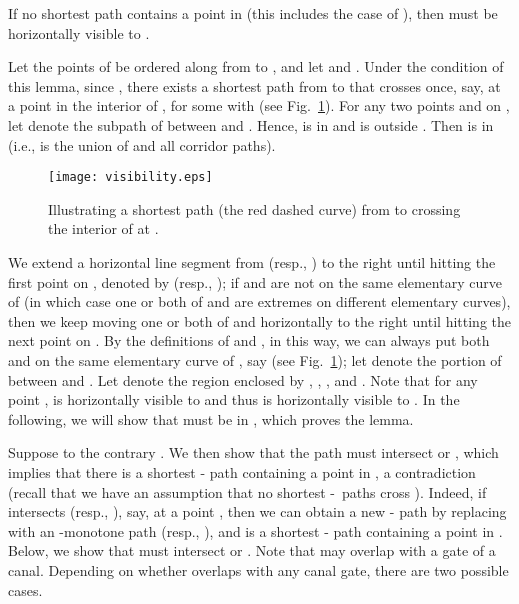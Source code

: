 \documentclass[english,runningheads,11pt]{llncs}
\def\st{-}
\newenvironment{proof}{\noindent {\textbf{Proof:}}\rm}{\hfill \rm}
\begin{document}
\begin{lemma}\label{lem:160}
If no shortest path  contains a point in
 (this includes the case of ), then
 must be horizontally visible to .
\end{lemma}
\begin{proof}
Let the points of  be
 ordered along  from  to
, and let  and . Under the condition of this lemma, since
, there exists a shortest path
 from  to  that crosses  once, say, at a point  in
the interior of ,
for some  with  (see Fig.~\ref{fig:visibility}).
For any two points  and 
on , let  denote the subpath of  between
 and . Hence,  is in  and  is outside . Then
 is in  (i.e.,  is the union of  and all corridor paths).


\begin{figure}[t]
\begin{minipage}[t]{\linewidth}
\begin{center}
\texttt{[image: visibility.eps]}
\caption{\footnotesize Illustrating a shortest path (the red dashed curve) from
 to  crossing the interior of  at .}
\label{fig:visibility}
\end{center}
\end{minipage}
\vspace*{-0.15in}
\end{figure}



We extend a horizontal line segment from  (resp., ) to the right until
hitting the first point on , denoted by  (resp., );
if  and  are not on the same elementary curve of
 (in which case
one or both of  and  are extremes on different
elementary curves),
then we keep moving one or both of  and  horizontally
to the right until hitting the next point on .
By the definitions of  and , in this way,
we can always put both  and  on the same
elementary curve of , say  (see Fig.~\ref{fig:visibility}); let
 denote the
portion of  between  and . Let  denote the
region enclosed by , ,
, and . Note that for
any point ,  is horizontally visible to
 and thus is horizontally visible to
.
In the following, we will show that  must be in , which proves the lemma.


Suppose to the contrary . We then show that
the path  must intersect  or
, which implies that
there is a shortest - path containing a point in
,
a contradiction (recall that we have an assumption that no shortest \st\ paths cross ). Indeed, if  intersects 
(resp., ), say, at a point , then we can obtain a new
- path  by replacing 
with an -monotone path 
(resp., ), and  is
a shortest - path containing
a point in .
Below, we show that  must intersect  or
. Note that  may
overlap with a gate of a canal. Depending on whether 
overlaps with any canal gate, there are two possible cases.


\end{proof}
\end{document}
